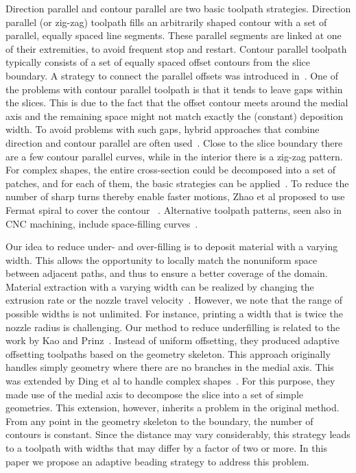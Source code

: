 Direction parallel and contour parallel are two basic toolpath strategies.
Direction parallel (or zig-zag) toolpath fills an arbitrarily shaped contour with a set of parallel, equally spaced line segments.
These parallel segments are linked at one of their extremities, to avoid frequent stop and restart.
Contour parallel toolpath typically consists of a set of equally spaced offset contours from the slice boundary.
A strategy to connect the parallel offsets was introduced in~\cite{KUIPERS2019CAD}.
One of the problems with contour parallel toolpath is that it tends to leave gaps within the slices.
This is due to the fact that the offset contour meets around the medial axis and the remaining space might not match exactly the (constant) deposition width.
To avoid problems with such gaps, hybrid approaches that combine direction and contour parallel are often used~\cite{Mcmains2000DETC,Jin2013adaptive}.
Close to the slice boundary there are a few contour parallel curves, while in the interior there is a zig-zag pattern.
For complex shapes, the entire cross-section could be decomposed into a set of patches, and for each of them, the basic strategies can be applied~\cite{Ding2014}.
To reduce the number of sharp turns thereby enable faster motions, Zhao et al proposed to use Fermat spiral to cover the contour ~\cite{Zhao2016}.
Alternative toolpath patterns, seen also in CNC machining, include space-filling curves~\cite{Cox1994CAD,Griffiths1994,Shaikh2016}.

Our idea to reduce under- and over-filling is to deposit material with a varying width.
This allows the opportunity to locally match the nonuniform space between adjacent paths, and thus to ensure a better coverage of the domain.
Material extraction with a varying width can be realized by changing the extrusion rate or the nozzle travel velocity~\cite{Ertay2018}.
However, we note that the range of possible widths is not unlimited. For instance, printing a width that is twice the nozzle radius is challenging.
Our method to reduce underfilling is related to the work by Kao and Prinz~\cite{kao1998optimal}.
Instead of uniform offsetting, they produced adaptive offsetting toolpaths based on the geometry skeleton.
This approach originally handles simply geometry where there are no branches in the medial axis.
This was extended by Ding et al to handle complex shapes~\cite{Ding2016a}.
For this purpose, they made use of the medial axis to decompose the slice into a set of simple geometries.
This extension, however, inherits a problem in the original method.
From any point in the geometry skeleton to the boundary, the number of contours is constant.
Since the distance may vary considerably, this strategy leads to a toolpath with widths that may differ by a factor of two or more.
In this paper we propose an adaptive beading strategy to address this problem.

